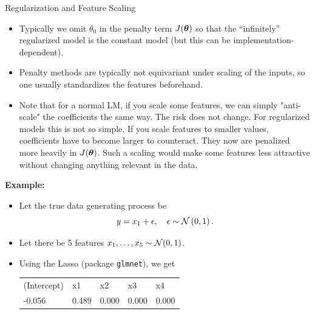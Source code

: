 \documentclass[11pt,compress,t,notes=noshow, xcolor=table]{beamer}
\begin{document}
\begin{vbframe}{Regularization and Feature Scaling}

  \begin{itemize}
    \item Typically we omit $\theta_0$ in the penalty term $J(\bm{\theta})$ so that the ``infinitely'' regularized model is the constant model (but this can be implementation-dependent).
    \item Penalty methods are typically not equivariant under scaling of the inputs, so one usually standardizes the features beforehand. 
    \item Note that for a normal LM, if you scale some features, we can simply "anti-scale" the coefficients the same way. The risk does not change. For regularized models this is not so simple. If you scale features to smaller values, coefficients have to become larger to counteract. They now are penalized more heavily in $J(\bm{\theta})$. Such a scaling would make some features less attractive without changing anything relevant in the data.
      
  \end{itemize}

\framebreak

\textbf{Example:}
\begin{itemize}
\item Let the true data generating process be
$$ y = x_1 + \epsilon, \quad \epsilon \sim \mathcal{N} \left(0, 1\right).$$
\item Let there be 5 features $x_1, \ldots, x_5 \sim \mathcal{N} (0,1)$.
\item Using the Lasso (package \texttt{glmnet}), we get
\footnotesize
\vspace{0.2cm}

\begin{table}[]
\begin{tabular}{lllll}
(Intercept) & x1    & x2    & x3    & x4    \\
-0.056      & 0.489 & 0.000 & 0.000 & 0.000 
\end{tabular}
\end{table}



\end{itemize}
\end{vbframe}
\end{document}
